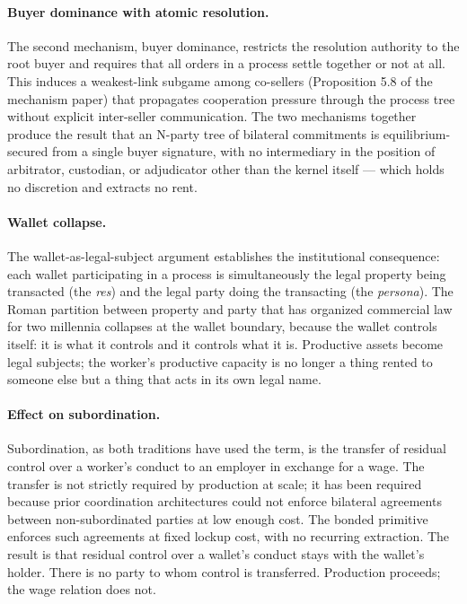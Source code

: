 \documentclass[11pt,a4paper]{article}
\theoremstyle{remark}
\begin{document}
\paragraph{Buyer dominance with atomic resolution.}
The second mechanism, buyer dominance, restricts the resolution
authority to the root buyer and requires that all orders in a
process settle together or not at all. This induces a
weakest-link subgame among co-sellers
(Proposition 5.8 of the mechanism paper) that propagates
cooperation pressure through the process tree without explicit
inter-seller communication. The two mechanisms together produce
the result that an N-party tree of bilateral commitments is
equilibrium-secured from a single buyer signature, with no
intermediary in the position of arbitrator, custodian, or
adjudicator other than the kernel itself --- which holds no
discretion and extracts no rent.

\paragraph{Wallet collapse.}
The wallet-as-legal-subject argument establishes the
institutional consequence: each wallet participating in a
process is simultaneously the legal property being transacted
(the \emph{res}) and the legal party doing the transacting (the
\emph{persona}). The Roman partition between
property and party that has organized commercial law for two
millennia collapses at the wallet boundary, because the wallet
controls itself: it is what it controls and it controls what it
is. Productive assets become legal subjects; the worker's
productive capacity is no longer a thing rented to someone else
but a thing that acts in its own legal name.

\paragraph{Effect on subordination.}
Subordination, as both traditions have used the term, is the
transfer of residual control over a worker's conduct to an
employer in exchange for a wage. The transfer is not strictly
required by production at scale; it has been required because
prior coordination architectures could not enforce bilateral
agreements between non-subordinated parties at low enough cost.
The bonded primitive enforces such agreements at fixed lockup
cost, with no recurring extraction. The result is that residual
control over a wallet's conduct stays with the wallet's holder.
There is no party to whom control is transferred. Production
proceeds; the wage relation does not.
\end{document}
